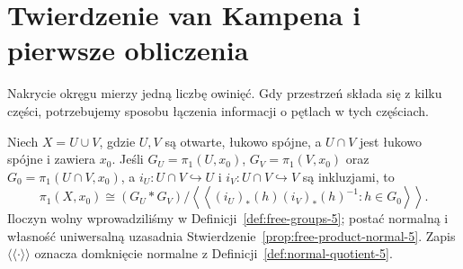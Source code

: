\section{Twierdzenie van Kampena i pierwsze obliczenia}
\label{sec:van-kampen}

Nakrycie okręgu mierzy jedną liczbę owinięć.
Gdy przestrzeń składa się z kilku części,
potrzebujemy sposobu łączenia informacji
o pętlach w tych częściach.

\begin{twierdzenie}
\label{thm:van-kampen}
Niech $X=U\cup V$, gdzie $U,V$ są otwarte,
łukowo spójne, a $U\cap V$ jest łukowo
spójne i zawiera $x_0$. Jeśli
$G_U=\pi_1(U,x_0)$, $G_V=\pi_1(V,x_0)$
oraz $G_0=\pi_1(U\cap V,x_0)$, a
$i_U:U\cap V\hookrightarrow U$ i $i_V:U\cap V\hookrightarrow V$
są inkluzjami, to
\[
 \pi_1(X,x_0)\cong
 (G_U*G_V)/
 \left\langle\!\left\langle
 (i_U)_*(h)(i_V)_*(h)^{-1}:h\in G_0
 \right\rangle\!\right\rangle.
\]
Iloczyn wolny wprowadziliśmy w Definicji~\ref{def:free-groups-5};
postać normalną i własność uniwersalną uzasadnia
Stwierdzenie~\ref{prop:free-product-normal-5}. Zapis
$\langle\!\langle\cdot\rangle\!\rangle$
oznacza domknięcie normalne z
Definicji~\ref{def:normal-quotient-5}.
\end{twierdzenie}
